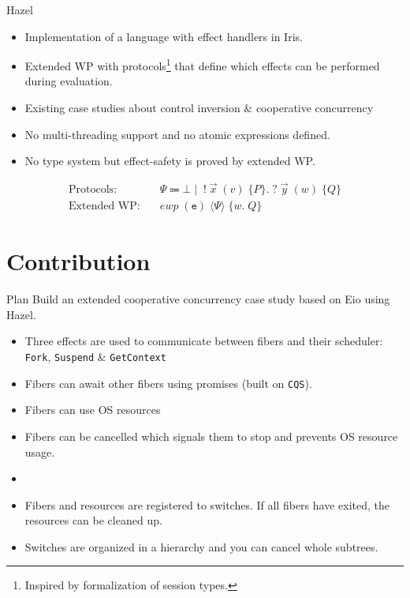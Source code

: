 \documentclass[aspectratio=43]{beamer}
\newcommand{\ocaml}[1]{\texttt{#1}}
\newcommand{\ewp}[3]{\textit{ewp}\; (#1)\; \langle #2 \rangle\; \{#3\}}
\begin{document}
\begin{frame}{Hazel}
    \begin{itemize}
        \item Implementation of a language with effect handlers in Iris.
        \item Extended WP with protocols\footnote{Inspired by formalization of session types.} that define which effects can be performed during evaluation.
        \item Existing case studies about control inversion \& cooperative concurrency
        \item No multi-threading support and no atomic expressions defined.
        \item No type system but effect-safety is proved by extended WP.
    \end{itemize}
    \begin{align*}
        \text{Protocols:}   & \quad \Psi \Coloneqq \bot \mid\; !\; \vec{x}\; (v)\; \{ P \}.\; ?\; \vec{y}\; (w)\; \{ Q \} \\
        \text{Extended WP:} & \quad \ewp{\texttt{e}}{\Psi}{w.\; Q}
    \end{align*}
\end{frame}

\section{Contribution}

\begin{frame}{Plan}
    Build an extended cooperative concurrency case study based on Eio using Hazel.
    \begin{itemize}
        \item Three effects are used to communicate between fibers and their scheduler: \ocaml{Fork}, \ocaml{Suspend} \& \ocaml{GetContext}
        \item Fibers can await other fibers using promises (built on \ocaml{CQS}).
        \item Fibers can use OS resources
        \item Fibers can be cancelled which signals them to stop and prevents OS resource usage.
        \item[]
        \item Fibers and resources are registered to switches. If all fibers have exited, the resources can be cleaned up.
        \item Switches are organized in a hierarchy and you can cancel whole subtrees.
    \end{itemize}
\end{frame}
\end{document}
